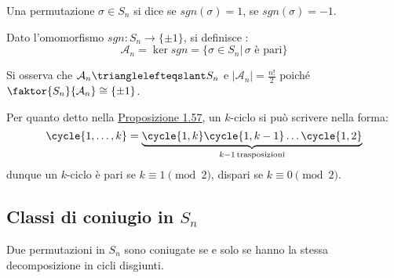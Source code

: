 \documentclass[11pt]{scrartcl}
\begin{document}
\begin{definition}
    Una permutazione $\sigma \in S_n$ si dice  se $sgn(\sigma) = 1$,  se $sgn(\sigma) = -1$.
\end{definition}

\begin{definition}
    Dato l'omomorfismo $sgn : S_n \longrightarrow \{\pm 1\}$, si definisce :
        \[ \mathcal{A}_n = \ker sgn = \{\sigma \in S_n |\, \text{$\sigma$ è pari}\}
            \]
\end{definition}

\begin{remark}
    Si osserva che $\mathcal{A}_n \trianglelefteqslant S_n$ e $\displaystyle|\mathcal{A}_n| = \frac{n!}{2}$ poiché $\faktor{S_n}{\mathcal{A}_n} \cong \{\pm 1\}$.
\end{remark}

\begin{remark}
    Per quanto detto nella \hyperref[trasp]{Proposizione 1.57}, un $k$-ciclo si può scrivere nella forma:
        \[ \cycle{1,\ldots,k} = \underbrace{\cycle{1,k}\cycle{1,k-1}\ldots\cycle{1,2}}_{k-1 \, \text{trasposizioni}}
            \]
    dunque un $k$-ciclo è pari se $k \equiv 1 \pmod 2$, dispari se $k \equiv 0 \pmod 2$.
\end{remark}

\pagebreak

\subsection{Classi di coniugio in $S_n$}
\begin{theorem}
    Due permutazioni in $S_n$ sono coniugate se e solo se hanno la stessa decomposizione in cicli disgiunti.
\end{theorem}
\end{document}
